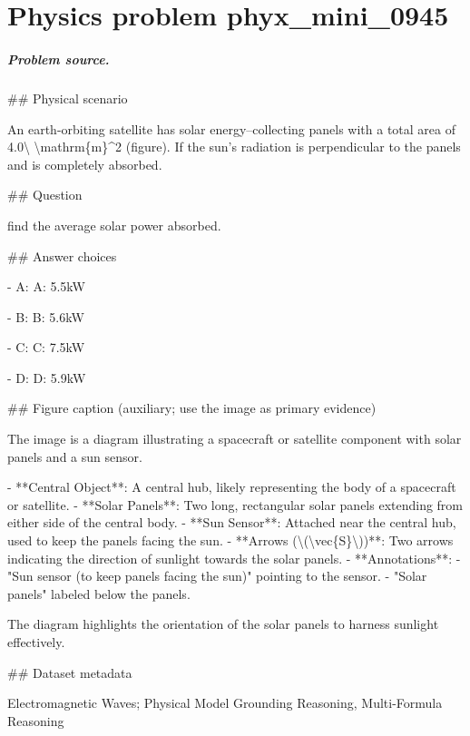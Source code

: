 
\chapter{Physics problem phyx\_mini\_0945}
\label{ch:PhyXMiniProblems_problem_phyx_mini_0945}

\paragraph{Problem source.}
\#\# Physical scenario

An earth-orbiting satellite has solar energy–collecting panels with a total area of 4.0\textbackslash{} \textbackslash{}mathrm\{m\}\textasciicircum{}2 (figure). If the sun’s radiation is perpendicular to the panels and is completely absorbed.

\#\# Question

find the average solar power absorbed.

\#\# Answer choices

- A: A: 5.5kW

- B: B: 5.6kW

- C: C: 7.5kW

- D: D: 5.9kW

\#\# Figure caption (auxiliary; use the image as primary evidence)

The image is a diagram illustrating a spacecraft or satellite component with solar panels and a sun sensor. 

- **Central Object**: A central hub, likely representing the body of a spacecraft or satellite.
- **Solar Panels**: Two long, rectangular solar panels extending from either side of the central body.
- **Sun Sensor**: Attached near the central hub, used to keep the panels facing the sun.
- **Arrows (\textbackslash{}(\textbackslash{}vec\{S\}\textbackslash{}))**: Two arrows indicating the direction of sunlight towards the solar panels.
- **Annotations**: 
  - "Sun sensor (to keep panels facing the sun)" pointing to the sensor.
  - "Solar panels" labeled below the panels.

The diagram highlights the orientation of the solar panels to harness sunlight effectively.

\#\# Dataset metadata

Electromagnetic Waves; Physical Model Grounding Reasoning, Multi-Formula Reasoning

